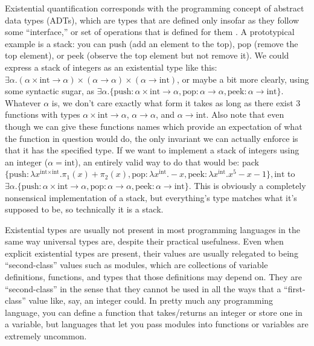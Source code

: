\documentclass[12pt]{article}
\begin{document}
Existential quantification corresponds with the programming concept of abstract data types (ADTs), which are types that are defined only insofar as they follow some ``interface,'' or set of operations that is defined for them \cite{mitchell}. A prototypical example is a stack: you can push (add an element to the top), pop (remove the top element), or peek (observe the top element but not remove it). We could express a stack of integers as an existential type like this: $\exists \alpha. (\alpha \times \text{int} \to \alpha) \times (\alpha \to \alpha) \times (\alpha \to \text{int})$, or maybe a bit more clearly, using some syntactic sugar, as $\exists \alpha. \{\text{push}: \alpha \times \text{int} \to \alpha, \text{pop}: \alpha \to \alpha, \text{peek}: \alpha \to \text{int}\}$. Whatever $\alpha$ is, we don't care exactly what form it takes as long as there exist 3 functions with types $\alpha \times \text{int} \to \alpha$, $\alpha \to \alpha$, and $\alpha \to \text{int}$. Also note that even though we can give these functions names which provide an expectation of what the function in question would do, the only invariant we can actually enforce is that it has the specified type. If we want to implement a stack of integers using an integer ($\alpha = \text{int}$), an entirely valid way to do that would be: pack $\{\text{push}: \lambda x^{\text{int} \times \text{int}}. \pi_1(x) + \pi_2(x), \text{pop}: \lambda x^{\text{int}}. -x, \text{peek}: \lambda x^{\text{int}}. x^5 - x - 1\}, \text{int}$ to $\exists \alpha. \{\text{push}: \alpha \times \text{int} \to \alpha, \text{pop}: \alpha \to \alpha, \text{peek}: \alpha \to \text{int}\}$. This is obviously a completely nonsensical implementation of a stack, but everything's type matches what it's supposed to be, so technically it is a stack.

Existential types are usually not present in most programming languages in the same way universal types are, despite their practical usefulness. Even when explicit existential types are present, their values are usually relegated to being ``second-class'' values such as modules, which are collections of variable definitions, functions, and types that those definitions may depend on. They are ``second-class'' in the sense that they cannot be used in all the ways that a ``first-class'' value like, say, an integer could. In pretty much any programming language, you can define a function that takes/returns an integer or store one in a variable, but languages that let you pass modules into functions or variables are extremely uncommon.
\end{document}
